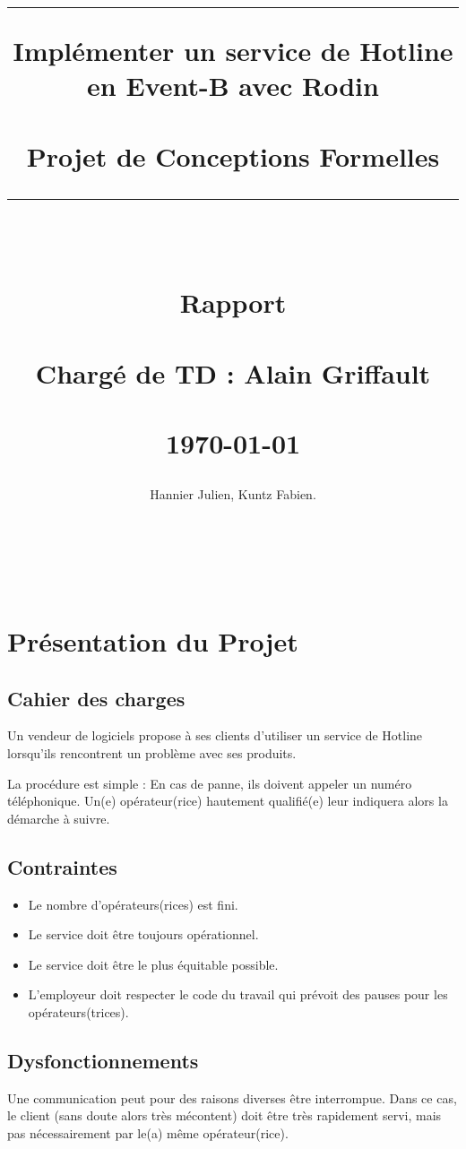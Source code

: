 \documentclass{article}
\title{
{\rule{\larg}{1mm}}\vspace{7mm}
\begin{flushright}
 \Huge{\bf Implémenter un service de Hotline} \\
 \Huge{\bf en Event-B avec Rodin} \\
 ~\\
 \huge{Projet de Conceptions Formelles}
\end{flushright}
\vspace{2mm}
{\rule{\larg}{1mm}}
\vspace{2mm} \\
\begin{flushright}
 \large{\bf Rapport} \\
 ~\\
 \large{Chargé de TD : Alain Griffault}\\
 ~\\
 \today
\end{flushright}
\vspace{9.5cm}
}
\author{\begin{tabular}{p{13.7cm}}
Hannier Julien, Kuntz Fabien.
\end{tabular}\\
\hline }
\date{}
\begin{document}
\thispagestyle{empty}
\maketitle
\newpage

\thispagestyle{empty}
~\newpage

\thispagestyle{empty}
\tableofcontents
\newpage

\setcounter{page}{1}

 \section{Présentation du Projet}
 
  \subsection{Cahier des charges}
  Un vendeur de logiciels propose à ses clients d'utiliser un service de
  Hotline lorsqu'ils rencontrent un problème avec ses
  produits.\newline
  
  La procédure est simple : En cas de panne, ils doivent appeler un
  numéro téléphonique. Un(e) opérateur(rice) hautement qualifié(e) leur
  indiquera alors la démarche à suivre. \newline
  
  \subsection{Contraintes}
  \begin{itemize}
   \item Le nombre d'opérateurs(rices) est fini.
   \item Le service doit être toujours opérationnel.
   \item Le service doit être le plus équitable possible.
   \item L'employeur doit respecter le code du travail qui prévoit des
		 pauses pour les opérateurs(trices).
  \end{itemize}

  \subsection{Dysfonctionnements}
  Une communication peut pour des raisons diverses être
  interrompue. Dans ce cas, le client (sans doute alors très mécontent)
  doit être très rapidement servi, mais pas nécessairement par le(a)
  même opérateur(rice).
\end{document}
